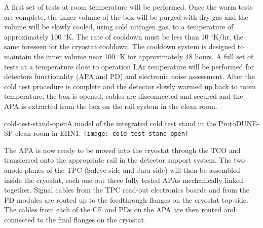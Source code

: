 A first set of tests at room temperature will be performed. Once the warm tests are complete, the inner volume of the box will be purged with dry gas and the volume will be slowly cooled, using cold nitrogen gas, to a temperature of approximately 100 $^\circ$K.  The rate of cooldown must be less than 10 $^\circ$K/hr, the same foreseen for the cryostat cooldown.  The cooldown system is designed to maintain the inner volume near 100 $^\circ$K for approximately 48 hours. A full set of tests at a temperature 
close to operation LAr temperature will be performed for detectors functionality (APA and PD) and electronic noise assessment.  
After the cold test procedure is complete and the detector slowly warmed up back to room temperature, the box is opened, cables are disconnected and secured and the APA is extracted from the box on the rail system in the clean room. 
\begin{cdrfigure}{cold-test-stand-open}{A model of the integrated cold test stand in the ProtoDUNE-SP clean room in EHN1.}
\texttt{[image: cold-test-stand-open]}
\end{cdrfigure}
The APA is now ready to be moved into the cryostat through the TCO and transferred onto the appropriate rail in the detector support system.  The two anode planes of the TPC (Saleve side and Jura side) will then be assembled inside the cryostat, each one out three fully tested APAs mechanically linked together. Signal cables from the TPC read-out electronics boards and from the PD modules 
are routed up to the feedthrough flanges on the cryostat top side.
The cables from each of the CE and PDs on the APA are then routed and connected to the final flanges on the cryostat. 

